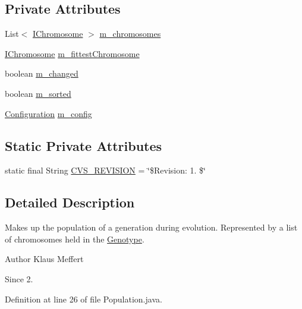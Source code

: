 \subsection*{Private Attributes}
\begin{DoxyCompactItemize}
\item 
List$<$ \hyperlink{interfaceorg_1_1jgap_1_1_i_chromosome}{I\-Chromosome} $>$ \hyperlink{classorg_1_1jgap_1_1_population_abc9fbe0eb7dc8ea169782159ca69ad70}{m\-\_\-chromosomes}
\item 
\hyperlink{interfaceorg_1_1jgap_1_1_i_chromosome}{I\-Chromosome} \hyperlink{classorg_1_1jgap_1_1_population_a58811aa95b2363c1078d54320fe6a252}{m\-\_\-fittest\-Chromosome}
\item 
boolean \hyperlink{classorg_1_1jgap_1_1_population_ade9e10d21203f65a3cf4c6385fd4eb76}{m\-\_\-changed}
\item 
boolean \hyperlink{classorg_1_1jgap_1_1_population_abb65c9029b8b947f25cbad4d2a5e855e}{m\-\_\-sorted}
\item 
\hyperlink{classorg_1_1jgap_1_1_configuration}{Configuration} \hyperlink{classorg_1_1jgap_1_1_population_a84643e202f73135b3fc3a31b19ed29e2}{m\-\_\-config}
\end{DoxyCompactItemize}
\subsection*{Static Private Attributes}
\begin{DoxyCompactItemize}
\item 
static final String \hyperlink{classorg_1_1jgap_1_1_population_a66404ad18ee170cbd1d4423aa0acec14}{C\-V\-S\-\_\-\-R\-E\-V\-I\-S\-I\-O\-N} = \char`\"{}\$Revision\-: 1. \$\char`\"{}
\end{DoxyCompactItemize}


\subsection{Detailed Description}
Makes up the population of a generation during evolution. Represented by a list of chromosomes held in the \hyperlink{classorg_1_1jgap_1_1_genotype}{Genotype}.

\begin{DoxyAuthor}{Author}
Klaus Meffert 
\end{DoxyAuthor}
\begin{DoxySince}{Since}
2. 
\end{DoxySince}


Definition at line 26 of file Population.\-java.




